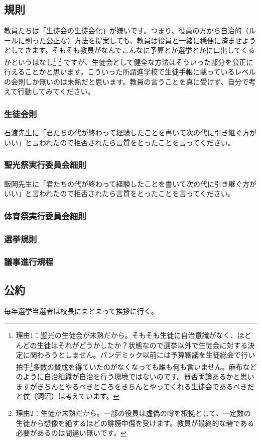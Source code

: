 \documentclass[dvipdfmx,jb5]{jarticle}
\begin{document}
\subsection{規則}
教員たちは「生徒会の生徒会化」が嫌いです。つまり、役員の方から自治的（ルールに則った公正な）方法を提案しても、教員は役員と一緒に穏便に済ませようとしてきます。そもそも教員がなんでこんなに予算とか選挙とかに口出してくるかというはなし\footnote{理由1：聖光の生徒会が未熟だから。そもそも生徒に自治意識がなく、ほとんどの生徒はそれがどうかしたか？状態なので選挙以外で生徒会に対する決定に関わろうとしません。パンデミック以前には予算審議を生徒総会で行い拍手\footnote{起立にしろよ}多数の賛成を得ていたのがなくなっても誰も何も言いません。麻布などのように自治組織が自治を行う環境ではないのです。賛否両論あるかと思いますがきちんとやるべきところをきちんとやってくれる生徒会であるべきだと僕（飼沼）は考えています。} \footnote{理由2：生徒が未熟だから。一部の役員は虚偽の噂を根拠として、一定数の生徒から想像を絶するほどの誹謗中傷を受けます。教員が最終的な砦である必要があるのは間違い無いです。} ですが、生徒会として健全な方法はそういった部分を公正に行えることかと思います。こういった所謂進学校で生徒手帳に載っているレベルの会則しか無いのは未熟だと思います。教員の言うことを真に受けず、自分で考えて行動してみてください。
\subsubsection{生徒会則}
石渡先生に「君たちの代が終わって経験したことを書いて次の代に引き継ぐ方がいい」と言われたので拒否されたら言質をとったことを言ってください。
\subsubsection{聖光祭実行委員会細則}
飯岡先生に「君たちの代が終わって経験したことを書いて次の代に引き継ぐ方がいい」と言われたので拒否されたら言質をとったことを言ってください。
\subsubsection{体育祭実行委員会細則}
\subsubsection{選挙規則}
\subsubsection{議事進行規程}
\subsection{公約}
毎年選挙当選者は校長にまとまって挨拶に行く。
\end{document}

